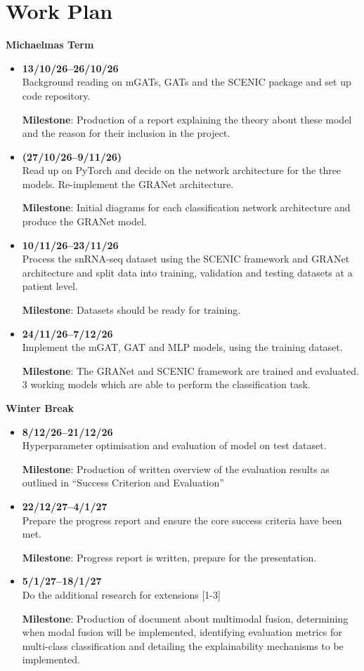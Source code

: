 \documentclass[12pt,a4paper]{report}
\begin{document}
\section{Work Plan}
\textbf{Michaelmas Term} \\ 
\begin{itemize}
    \item \textbf{13/10/26--26/10/26} \\
Background reading on mGATs, GATs and the SCENIC package and set up code repository.

\textbf{Milestone}: Production of a report explaining the theory about these model and the reason for their inclusion in the project.
 
    \item \textbf{(27/10/26--9/11/26)} \\
Read up on PyTorch and decide on the network architecture for the three models. Re-implement the GRANet architecture. 

\textbf{Milestone}: Initial diagrams for each classification network architecture and produce the GRANet model.
    \item \textbf{10/11/26--23/11/26} \\
Process the snRNA-seq dataset using the SCENIC framework  and GRANet architecture and split data into training, validation and testing datasets at a patient level. 

\textbf{Milestone}: Datasets should be ready for training.

    \item \textbf{24/11/26--7/12/26} \\
Implement the mGAT, GAT and MLP models, using the training dataset. 

\textbf{Milestone}: The GRANet and SCENIC framework are trained and evaluated. 3 working models which are able to perform the classification task. 
\end{itemize}
\textbf{Winter Break} \\ 
\begin{itemize}
    \item \textbf{8/12/26--21/12/26} \\
Hyperparameter optimisation and evaluation of model on test dataset.

\textbf{Milestone}: Production of written overview of the evaluation results as outlined in \enquote{Success
Criterion and Evaluation}
    \item \textbf{22/12/27--4/1/27} \\
    Prepare the progress report and ensure the core success criteria have been met. 
    
    \textbf{Milestone}: Progress report is written, prepare for the presentation.
    \item \textbf{5/1/27--18/1/27} \\
    Do the additional research for extensions [1-3]
    
    \textbf{Milestone}: Production of document about multimodal fusion, determining when modal fusion will be implemented, identifying evaluation metrics for multi-class classification and detailing the explainability mechanisms to be implemented.
\end{itemize}
\end{document}
